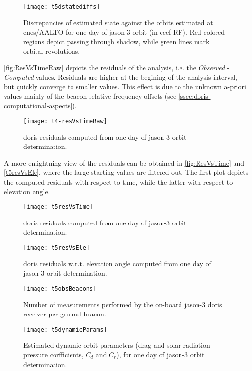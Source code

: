 \begin{figure}
    \centering
    \texttt{[image: t5dstatediffs]}
    \caption{Discrepancies of estimated state against the orbits estimated at \gls{cnes}/AALTO for one day of \gls{jason}-3 orbit (in \gls{ecef} RF). Red colored regions depict passing through shadow, while green lines mark orbital revolutions.}
    \label{fig:statediffs-details}
\end{figure}

\autoref{fig:ResVsTimeRaw} depicts the residuals of the analysis, i.e. the \emph{Observed} 
- \emph{Computed} values. Residuals are higher at the begining of the analysis interval, but 
quickly converge to smaller values. This effect is due to the unknown a-priori values mainly of 
the beacon relative frequency offsets (see \autoref{ssec:doris-computational-aspects}). 
\begin{figure}[h]
    \centering
    \texttt{[image: t4-resVsTimeRaw]}
    \caption{\gls{doris} residuals computed from one day of \gls{jason}-3 orbit determination.}
    \label{fig:ResVsTimeRaw}
\end{figure}

A more enlightning view of the residuals can be obtained in \autoref{fig:ResVsTime} and 
\autoref{t5resVsEle}, where the large starting values are filtered out. The first 
plot depicts the computed residuals with respect to time, while the latter with respect to 
elevation angle.
\begin{figure}[h]
    \centering
    \texttt{[image: t5resVsTime]}
    \caption{\gls{doris} residuals computed from one day of \gls{jason}-3 orbit determination.}
    \label{fig:ResVsTime}
\end{figure}

\begin{figure}[h]
    \centering
    \texttt{[image: t5resVsEle]}
    \caption{\gls{doris} residuals w.r.t. elevation angle computed from one day of \gls{jason}-3 orbit determination.}
    \label{fig:ResVsEle}
\end{figure}

\begin{figure}
    \centering
    \texttt{[image: t5obsBeacons]}
    \caption{Number of measurements performed by the on-board \gls{jason}-3 \gls{doris} receiver per ground beacon.}
    \label{fig:obsPerBeacon}
\end{figure}

\begin{figure}
    \centering
    \texttt{[image: t5dynamicParams]}
    \caption{Estimated dynamic orbit parameters (drag and solar radiation pressure corfficients, $C_d$ and $C_r$), for one day of \gls{jason}-3 orbit determination.}
    \label{fig:EstimDynamicParams}
\end{figure}

